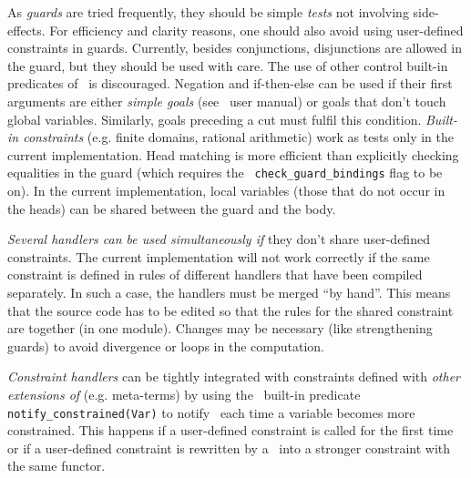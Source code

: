 
As {\em guards} are tried frequently, they should be
simple {\em tests} not involving side-effects. For efficiency and
clarity reasons, one should also avoid using user-defined constraints
in guards.  Currently, besides conjunctions, disjunctions are allowed
in the guard, but they should be used with care.  The use of other
control built-in predicates of \eclipse\ is discouraged.  Negation and
if-then-else can be used if their first arguments are either {\em
simple goals} (see \eclipse\ user manual) or goals that don't touch
global variables. Similarly, goals preceding a cut must fulfil this
condition.
%
{\em Built-in constraints} (e.g. finite domains, rational arithmetic)
work as tests only in the current implementation.  
%
Head matching is more efficient than
explicitly checking equalities in the guard (which requires the {\tt
check\_guard\_bindings} flag to be on).  
%
In the current
implementation, local variables (those
that do not occur in the heads) can be shared between the guard and
the body. 

{\em Several handlers can be used simultaneously if} they don't share
user-defined constraints. The current implementation will not work
correctly if the same constraint is defined in rules of different
handlers that have been compiled separately. In such a case, the
handlers must be merged ``by hand''. This means that the source code
has to be edited so that the rules for the shared constraint are
together (in one module). Changes may be necessary (like
strengthening guards) to avoid divergence or loops in the computation.

{\em Constraint handlers} can be tightly integrated with constraints
defined with {\em other extensions of \eclipse} (e.g. meta-terms) by using
the \eclipse\ built-in predicate {\tt notify\_constrained(Var)} to notify
\eclipse\ each time a variable becomes more constrained.
This happens if a user-defined constraint is called for the first time
or if a user-defined constraint is rewritten by a \chr\ into a stronger
constraint with the same functor.


